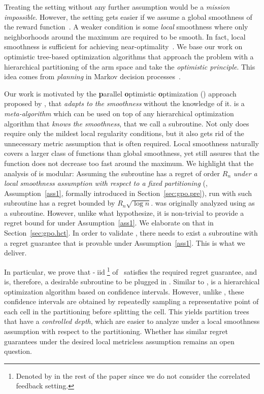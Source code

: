 Treating the setting without any further assumption would be a \emph{mission impossible}. However, the setting gets easier if we assume a global smoothness of the reward function~\citep{agrawal1995continuum,kleinberg2004nearly,kleinberg2008multi,cope2009,auer2007improved,slivkins2011taxonomy,kleinberg2013}. A weaker condition is some \emph{local} smoothness where only neighborhoods around the maximum are required to be smooth.  In fact, local smoothness is sufficient for achieving near-optimality~\citep{valko2013stosoo,azar2014online,grill2015poo,bull2015adaptive}.
We base our work on optimistic tree-based optimization algorithms \citep{munos2011soo,valko2013stosoo,preux2014bandits,azar2014online} that approach the problem with a hierarchical partitioning of the arm space and take the \textit{optimistic principle}. This idea comes from \textit{planning} in Markov decision processes~\citep{kocsis2006bandit,munos2014,grill2016trail}.

Our work is motivated by the \textbf{p}arallel \textbf{o}ptimistic \textbf{o}ptimization (\POO) approach proposed by \citet{grill2015poo},  that \emph{adapts to the smoothness} without the knowledge of it. \POO is a \textit{meta-algorithm} which can be used on top of any hierarchical optimization algorithm that \emph{knows the smoothness}, that we call a subroutine. Not only does \POO require only the mildest local regularity conditions, but it also gets rid of the unnecessary metric assumption that is often required. Local smoothness naturally covers a larger class of functions than global smoothness, yet still assures that the function does not decrease too fast around the maximum. We highlight that the analysis of \POO is modular: Assuming the subroutine has a regret of order $R_n$ \emph{under a local smoothness assumption with respect to a fixed partitioning} (\citealt{grill2015poo}, Assumption~\ref{ass1}, formally introduced in Section~\ref{sec:gpo.pre}), \POO run with such subroutine has a regret bounded by $R_n \sqrt{\log n}$. \POO was originally analyzed using \HOO as a subroutine. However, unlike what \citet{grill2015poo} hypothesize, it is non-trivial to provide a regret bound for \HOO under Assumption~\ref{ass1}. We elaborate on that in Section~\ref{sec:gpo.hct}. In order to validate \POO,  there needs to exist a subroutine with a  regret guarantee that is provable under Assumption~\ref{ass1}. This is what we deliver.

In particular, we prove that \HCT-$\operatorname{iid}$\footnote{Denoted by \HCT in the rest of the paper since we do not consider the correlated feedback setting.} of~\cite{azar2014online} satisfies the required regret guarantee, and is, therefore, a desirable subroutine to be plugged in \POO. Similar to \HOO, \HCT is a hierarchical optimization algorithm based on confidence intervals. However, unlike \HOO, these confidence intervals are obtained by repeatedly sampling a representative point of each cell in the partitioning before splitting the cell. This yields partition trees that have a \emph{controlled depth}, which are easier to analyze under a local smoothness assumption with respect to the partitioning. Whether \HOO has similar regret guarantees under the desired local metricless assumption remains an open question.

